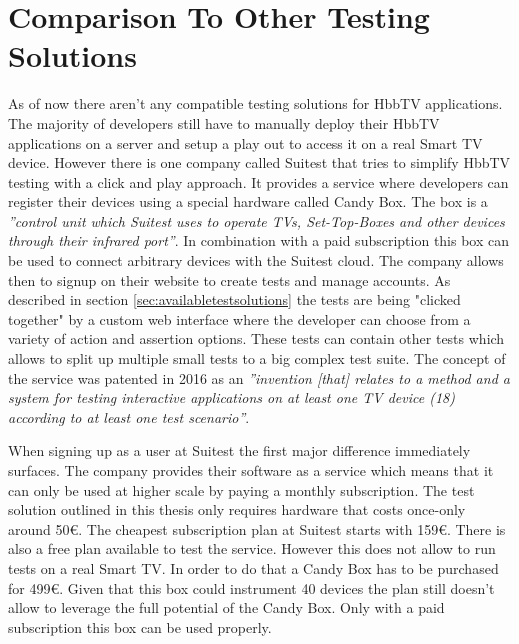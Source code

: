 \section{Comparison To Other Testing Solutions\label{sec:businessmodel}}

As of now there aren't any compatible testing solutions for HbbTV applications. The majority of developers still have to manually deploy their HbbTV applications on a server and setup a play out to access it on a real Smart TV device. However there is one company called Suitest that tries to simplify HbbTV testing with a click and play approach. It provides a service where developers can register their devices using a special hardware called Candy Box. The box is a \textit{''control unit which Suitest uses to operate TVs, Set-Top-Boxes and other devices through their infrared port''}\cite{candybox}. In combination with a paid subscription this box can be used to connect arbitrary devices with the Suitest cloud. The company allows then to signup on their website to create tests and manage accounts. As described in section \ref{sec:availabletestsolutions} the tests are being "clicked together" by a custom web interface where the developer can choose from a variety of action and assertion options. These tests can contain other tests which allows to split up multiple small tests to a big complex test suite. The concept of the service was patented in 2016 as an \textit{''invention [that] relates to a method and a system for testing interactive applications on at least one TV device (18) according to at least one test scenario''}\cite{krocek2016method}.

When signing up as a user at Suitest the first major difference immediately surfaces. The company provides their software as a service which means that it can only be used at higher scale by paying a monthly subscription. The test solution outlined in this thesis only requires hardware that costs once-only around 50\euro. The cheapest subscription plan at Suitest starts with 159\euro. There is also a free plan available to test the service. However this does not allow to run tests on a real Smart TV. In order to do that a Candy Box has to be purchased for 499\euro. Given that this box could instrument 40 devices the plan still doesn't allow to leverage the full potential of the Candy Box. Only with a paid subscription this box can be used properly.

